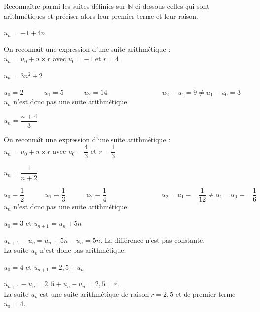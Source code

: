 \documentclass[12pt,a4paper]{article}  %
\begin{document}
Reconnaître parmi les suites définies sur $\mathbb{N}$ ci-dessous celles qui sont arithmétiques et préciser alors leur premier terme et leur raison.
\begin{enumMet}
    \item $u_{n}=-1+4 n$\quad{}\\
    \begin{corrBox}
        On reconnaît une expression d'une suite arithmétique :\\
        $u_n=u_0+n\times r$ avec $u_0=-1$ et $r=4$
    \end{corrBox}
    \item $u_{n}=3 n^{2}+2$\quad{}\\
    \begin{corrBox}
        $u_0=2\quad\quad\quad u_1=5\quad\quad\quad u_2=14\quad\quad\quad\quad\quad\quad\quad\quad u_2-u_1=9\neq u_1-u_0=3$\\
        $u_n$ n'est donc pas une suite arithmétique.
    \end{corrBox}
    \item $u_{n}=\dfrac{n+4}{3}$\quad{}\\
    \begin{corrBox}
        On reconnaît une expression d'une suite arithmétique :\\
        $u_n=u_0+n\times r$ avec $u_0=\dfrac{4}{3}$ et $r=\dfrac{1}{3}$
    \end{corrBox}
    \item $u_{n}=\dfrac{1}{n+2}$ \quad{}\\
    \begin{corrBox}
        $u_0=\dfrac{1}{2}\quad\quad\quad u_1=\dfrac{1}{3}\quad\quad\quad u_2=\dfrac{1}{4}\quad\quad\quad\quad\quad\quad\quad\quad u_2-u_1=-\dfrac{1}{12}\neq u_1-u_0=-\dfrac{1}{6}$\\
        $u_n$ n'est donc pas une suite arithmétique.
    \end{corrBox}
    \item $u_{0}=3$ et $u_{n+1}=u_{n}+5 n$ \quad{}\\
    \begin{corrBox}
        $u_{n+1}-u_n=u_n+5 n-u_n=5n$. La différence n'est pas constante.\\
        La suite $u_n$ n'est donc pas arithmétique. 
    \end{corrBox}
    \item $u_{0}=4$ et $u_{n+1}=2,5+u_{n}$ \quad{}\\
    \begin{corrBox}
        $u_{n+1}-u_n=2,5+u_n-u_n=2,5=r$.\\
        La suite $u_n$ est une suite arithmétique de raison $r=2,5$ et de premier terme $u_0=4$. 
    \end{corrBox}
\end{enumMet}
\end{document}

